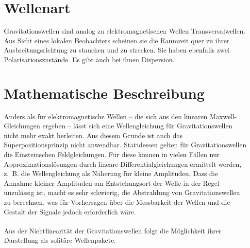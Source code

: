 \section{Wellenart}
Gravitationswellen sind analog zu elektromagnetischen Wellen Transversalwellen. Aus Sicht eines lokalen Beobachters scheinen sie die Raumzeit quer zu ihrer Ausbreitungsrichtung zu stauchen und zu strecken. Sie haben ebenfalls zwei Polarisationszustände. Es gibt auch bei ihnen Dispersion.

\section{Mathematische Beschreibung}
Anders als für elektromagnetische Wellen – die sich aus den linearen Maxwell-Gleichungen ergeben – lässt sich eine Wellengleichung für Gravitationswellen nicht mehr exakt herleiten. Aus diesem Grunde ist auch das Superpositionsprinzip nicht anwendbar. Stattdessen gelten für Gravitationswellen die Einsteinschen Feldgleichungen. Für diese können in vielen Fällen nur Approximationslösungen durch lineare Differentialgleichungen ermittelt werden, z. B. die Wellengleichung als Näherung für kleine Amplituden. Dass die Annahme kleiner Amplituden am Entstehungsort der Welle in der Regel unzulässig ist, macht es sehr schwierig, die Abstrahlung von Gravitationswellen zu berechnen, was für Vorhersagen über die Messbarkeit der Wellen und die Gestalt der Signale jedoch erforderlich wäre. \\ \\
Aus der Nichtlinearität der Gravitationswellen folgt die Möglichkeit ihrer Darstellung als solitäre Wellenpakete.


